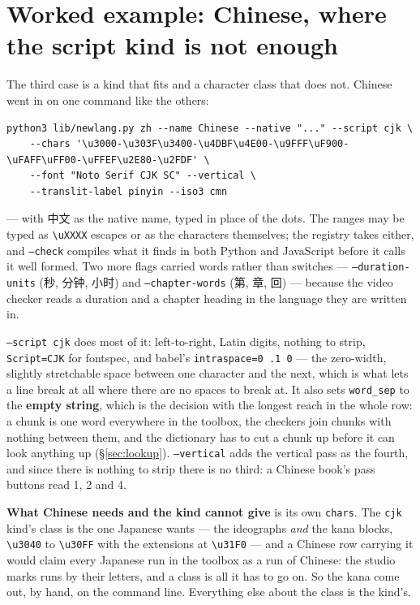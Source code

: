 \documentclass[11pt,oneside]{report}
\newcommand{\cw}[1]{\mbox{\foreignlanguage{chinese}{#1}}}
\begin{document}
\section{Worked example: Chinese, where the script kind is not enough}

The third case is a kind that fits and a character class that does not.
Chinese went in on one command like the others:

\begin{lstlisting}
python3 lib/newlang.py zh --name Chinese --native "..." --script cjk \
    --chars '\u3000-\u303F\u3400-\u4DBF\u4E00-\u9FFF\uF900-\uFAFF\uFF00-\uFFEF\u2E80-\u2FDF' \
    --font "Noto Serif CJK SC" --vertical \
    --translit-label pinyin --iso3 cmn
\end{lstlisting}

\noindent --- with \cw{中文} as the native name, typed in place of the dots.
The ranges may be typed as \texttt{\textbackslash uXXXX} escapes or as the
characters themselves; the registry takes either, and \texttt{--check}
compiles what it finds in both Python and JavaScript before it calls it well
formed. Two more flags carried words rather than switches ---
\texttt{--duration-units} (\cw{秒}, \cw{分钟}, \cw{小时}) and
\texttt{--chapter-words} (\cw{第}, \cw{章}, \cw{回}) --- because the video
checker reads a duration and a chapter heading in the language they are
written in.

\texttt{--script cjk} does most of it: left-to-right, Latin digits, nothing
to strip, \texttt{Script=CJK} for fontspec, and babel's
\texttt{intraspace=0 .1 0} --- the zero-width, slightly stretchable space
between one character and the next, which is what lets a line break at all
where there are no spaces to break at. It also sets \texttt{word\_sep} to
the \textbf{empty string}, which is the decision with the longest reach in
the whole row: a chunk is one word everywhere in the toolbox, the checkers
join chunks with nothing between them, and the dictionary has to cut a chunk
up before it can look anything up (\S\ref{sec:lookup}). \texttt{--vertical}
adds the vertical pass as the fourth, and since there is nothing to strip
there is no third: a Chinese book's pass buttons read 1, 2 and 4.

\textbf{What Chinese needs and the kind cannot give} is its own
\texttt{chars}. The \texttt{cjk} kind's class is the one Japanese wants ---
the ideographs \emph{and} the kana blocks, \texttt{\textbackslash u3040} to
\texttt{\textbackslash u30FF} with the extensions at
\texttt{\textbackslash u31F0} --- and a Chinese row carrying it would claim
every Japanese run in the toolbox as a run of Chinese: the studio marks runs
by their letters, and a class is all it has to go on. So the kana come out,
by hand, on the command line. Everything else about the class is the kind's.
\end{document}
